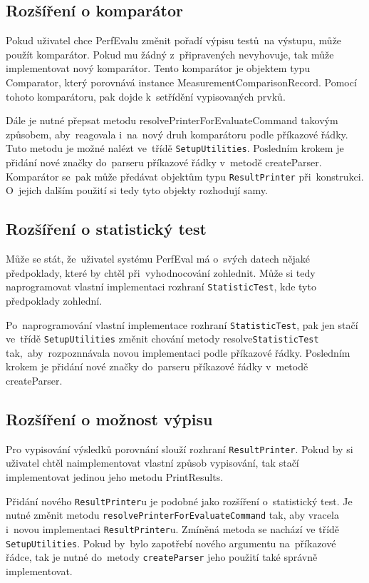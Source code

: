 \subsection{Rozšíření o komparátor}

Pokud uživatel chce  PerfEvalu změnit pořadí výpisu testů~na výstupu, může použít komparátor.
Pokud mu žádný z~připravených nevyhovuje, tak může implementovat nový komparátor.
Tento komparátor je objektem typu Comparator, který porovnává instance MeasurementComparisonRecord. Pomocí tohoto
komparátoru, pak dojde k~setřídění vypisovaných prvků.

Dále je nutné přepsat metodu resolvePrinterForEvaluateCommand takovým způsobem, aby~reagovala i~na~nový druh komparátoru
podle příkazové řádky. Tuto metodu je možné nalézt ve~třídě \lstinline{SetupUtilities}.
Posledním krokem je přidání nové značky do~parseru příkazové řádky v~metodě createParser.
Komparátor se~pak může předávat objektům typu \lstinline{ResultPrinter} při~konstrukci.
O~jejich dalším použití si tedy tyto objekty rozhodují samy.

\subsection{Rozšíření o statistický test}

Může se stát, že~uživatel systému PerfEval má o~svých datech nějaké předpoklady, které
by chtěl při~vyhodnocování zohlednit. Může si tedy naprogramovat vlastní implementaci
rozhraní \lstinline{StatisticTest}, kde tyto předpoklady zohlední.

Po~naprogramování vlastní implementace rozhraní \lstinline{StatisticTest}, pak jen stačí ve~třídě \lstinline{SetupUtilities}
změnit chování metody resolve\lstinline{StatisticTest} tak,~aby~rozpoznnávala novou implementaci podle příkazové řádky. Posledním krokem je
přidání nové značky do~parseru příkazové řádky v~metodě createParser.

\subsection{Rozšíření o možnost výpisu}

Pro vypisování výsledků porovnání slouží rozhraní \lstinline{ResultPrinter}. Pokud by si uživatel chtěl naimplementovat
vlastní způsob vypisování, tak stačí implementovat jedinou jeho metodu PrintResults.

Přidání nového \lstinline{ResultPrinter}u je podobné jako rozšíření o~statistický test.
Je nutné změnit metodu \lstinline{resolvePrinterForEvaluateCommand} tak, aby vracela
i~novou implementaci \lstinline{ResultPrinter}u. Zmíněná metoda se nachází ve třídě
\lstinline{SetupUtilities}.
Pokud by~bylo zapotřebí nového argumentu na~příkazové řádce, tak je nutné do~metody \lstinline{createParser} jeho použití také
správně implementovat.

